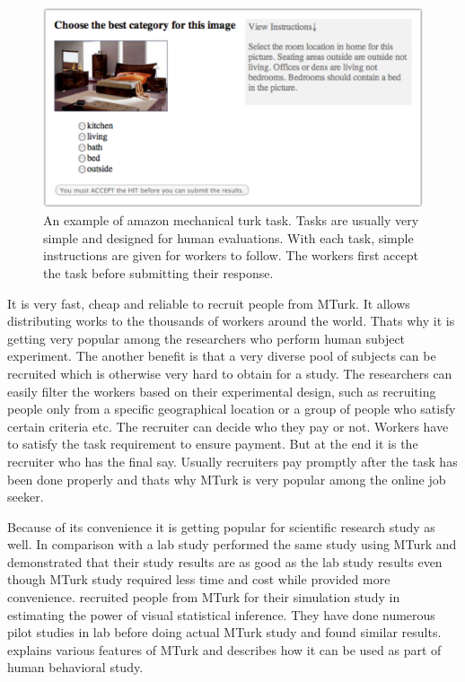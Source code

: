 \documentclass[11pt]{article}
\begin{document}
\begin{figure}[htbp] 
   \centering
   \includegraphics[width=5in]{amazon_task.pdf} 
   \caption{An example of amazon mechanical turk task. Tasks are usually very simple and designed for human evaluations. With each task, simple instructions are given for workers to follow. The workers first accept the task before submitting their response.}
   \label{fig:amazon_task}
\end{figure}



It is very fast, cheap and reliable to recruit people from MTurk. It allows distributing works to the thousands of workers around the world. Thats why it is getting very popular among the researchers who perform human subject experiment. The another benefit is that a very diverse pool of subjects can be recruited which is otherwise very hard to obtain for a study. The researchers can easily filter the workers based on their experimental design, such as recruiting people only from a specific geographical location or a group of people who satisfy certain criteria etc. The recruiter can decide who they pay or not. Workers have to satisfy the task requirement to ensure payment. But at the end it is the recruiter who has the final say. Usually recruiters pay promptly after the task has been done properly and thats why MTurk is very popular among the online job seeker. 

Because of its convenience it is getting popular for scientific research study as well. In comparison with a lab study \cite{suri:2010} performed the same study using MTurk and demonstrated that their study results are as good as the lab study results even though MTurk study required less time and cost while provided more convenience. \cite{majumder:2013} recruited people from MTurk for their simulation study in estimating the power of visual statistical inference. They have done numerous pilot studies in lab before doing actual MTurk study and found similar results. \cite{mason:2012} explains various features of MTurk and describes how it can be used as part of human behavioral study.
\end{document}
